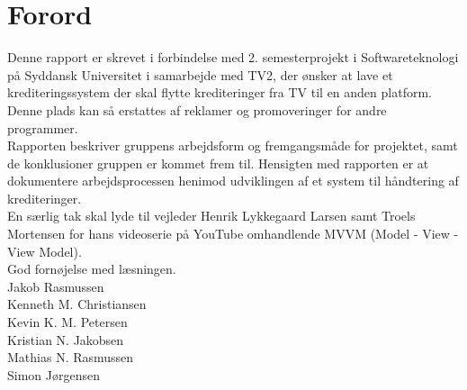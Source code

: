 \section{Forord}

Denne rapport er skrevet i forbindelse med 2. semesterprojekt i Softwareteknologi på Syddansk Universitet i samarbejde med TV2, der ønsker at lave et krediteringssystem der skal flytte krediteringer fra TV til en anden platform. Denne plads kan så erstattes af reklamer og promoveringer for andre programmer.\\
Rapporten beskriver gruppens arbejdsform og fremgangsmåde for projektet, samt de konklusioner gruppen er kommet frem til. Hensigten med rapporten er at dokumentere arbejdsprocessen henimod udviklingen af et system til håndtering af krediteringer.\\
En særlig tak skal lyde til vejleder Henrik Lykkegaard Larsen samt Troels Mortensen for hans videoserie på YouTube omhandlende MVVM (Model - View - View Model).\\


God fornøjelse med læsningen.\\

Jakob Rasmussen\\
Kenneth M. Christiansen\\
Kevin K. M. Petersen\\
Kristian N. Jakobsen\\
Mathias N. Rasmussen\\
Simon Jørgensen\\